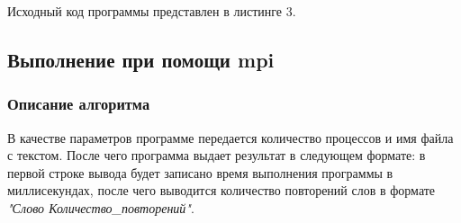 \documentclass[12pt,a4paper]{report}
\begin{document}
				Исходный код программы представлен в листинге 3.
				
			\subsection{Выполнение при помощи mpi}
				\subsubsection{Описание алгоритма}
					В качестве параметров программе передается количество процессов и имя файла с текстом. После чего программа выдает результат в следующем формате: в первой строке вывода будет записано время выполнения программы в миллисекундах, после чего выводится количество повторений слов в формате \textit{"Слово Количество\_повторений"}.
					
\end{document}
